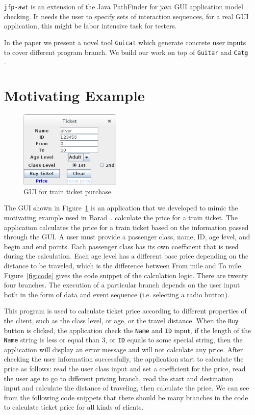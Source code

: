 \documentclass[blind]{sig-alternate-05-2015}
\begin{document}
\texttt{jfp-awt} \cite{jpfawt} is an extension of the Java PathFinder for java GUI application model checking. It needs the user to specify sets of interaction sequences, for a real GUI application, this might be labor intensive task for testers.

In the paper we present a novel tool \texttt{Guicat} which generate concrete user inputs to cover different program branch. We build our work on top of \texttt{Guitar} and \texttt{Catg} \cite{catg}.




\section{Motivating Example}

\begin{figure}
\label{fig:ex}
  \centering
  \includegraphics[width=50mm,scale=0.5]{./res/ticket.png}
  \caption{GUI for train ticket purchase}
\end{figure}

The GUI shown in Figure~\ref{fig:ex} is an application that we developed to mimic the motivating example used in Barad~\cite{}. calculate the price for a train ticket. The application calculates the price for a train ticket based on the information passed through the GUI. A user must provide a passenger class, name, ID, age level, and begin
and end points. Each passenger class has its own coefficient that is used during the calculation. Each age level has a different
base price depending on the distance to be traveled,
which is the difference between From mile and To mile. Figure~\ref{fig:code} gives the code snippet of the calculation logic.  There are twenty four branches. The
execution of a particular branch depends on the user
input both in the form of data and event sequence (i.e.
selecting a radio button).


This program is used to calculate ticket price according to different properties of the client, such as the class level, or age, or the travel distance. When the \texttt{Buy} button is clicked, the application check the \texttt{Name} and \texttt{ID} input, if the length of the \texttt{Name} string is less or equal than 3, or \texttt{ID} equals to some special string, then the application will display an error message and will not calculate any price. After checking the user information successfully, the application start to calculate the price as follows: read the user class input and set a coefficient for the price, read the user age to go to different pricing branch, read the start and destination input and calculate the distance of traveling, then calculate the price. We can see from the following code snippets that there should be many branches in the code to calculate ticket price for all kinds of clients.
\end{document}
